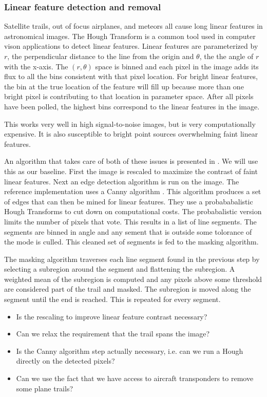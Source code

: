 \subsubsection{Linear feature detection and removal}

Satellite trails, out of focus airplanes, and meteors all cause long linear features in astronomical images.  The Hough Transform \citep{citation_needed} is a common tool used in computer vison applications to detect linear features.  Linear features are parameterized by $r$, the perpendicular distance to the line from the origin and $\theta$, the the angle of $r$ with the x-axis.  The $(r, \theta)$ space is binned and each pixel in the image adds its flux to all the bins consistent with that pixel location.  For bright linear features, the bin at the true location of the feature will fill up because more than one bright pixel is contributing to that location in parameter space.  After all pixels have been polled, the highest bins correspond to the linear features in the image.

This works very well in high signal-to-noise images, but is very computationally expensive.  It is also susceptible to bright point sources overwhelming faint linear features.  

An algorithm that takes care of both of these issues is presented in \cite{borncamp_lim16}.  We will use this
as our baseline.  First the image is rescaled to maximize the contrast of faint linear features.  Next an edge detection algorithm is run on the image.  The reference implementation uses a Canny algorithm \citep{canny86}.  This algorithm produces a set of edges that can then be mined for linear features.  They use a probababalistic Hough Transforms \citep{galamhos99} to cut down on computational costs.  The probabalistic version limits the number of pixels that vote.  This results in a list of line segments.  The segments are binned in angle and any sement that is outside some tolorance of the mode is culled.  This cleaned set of segments is fed to the masking algorithm.

The masking algorithm traverses each line segment found in the previous step by selecting a subregion around the segment and flattening the subregion.  A weighted mean of the subregion is computed and any pixels above some threshold are considered part of the trail and masked.  The subregion is moved along the segment until the end is reached.  This is repeated for every segment.

\begin{note}
\begin{itemize}
\item Is the rescaling to improve linear feature contrast necessary?
\item Can we relax the requirement that the trail spans the image?
\item Is the Canny algorithm step actually necessary, i.e. can we run a Hough directly on the detected pixels?
\item Can we use the fact that we have access to aircraft transponders to remove some plane trails?
\end{itemize}
\end{note}

